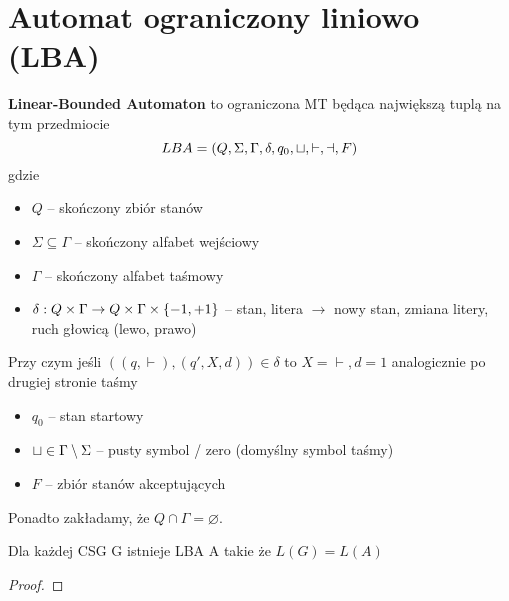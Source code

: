 \section{Automat ograniczony liniowo (LBA)}


\begin{definition}

 \textbf{Linear-Bounded Automaton} to ograniczona MT będąca największą tuplą na tym przedmiocie 
    \[
        LBA = (Q, \Sigma, \Gamma, \delta, q_0, \sqcup, \vdash, \dashv, F)
    \]
    gdzie
    \begin{itemize}
        \item \( Q \) -- skończony zbiór stanów
        \item \( \Sigma \subseteq \Gamma \) -- skończony alfabet wejściowy
        \item \( \Gamma \) -- skończony alfabet taśmowy
        \item \( \delta : Q \times \Gamma \rightarrow 
        Q \times \Gamma \times \set{-1, +1}
        \) -- stan, litera \( \rightarrow \) nowy stan, zmiana litery, ruch głowicą (lewo, prawo)
    \end{itemize}
    Przy czym jeśli \( ((q, \vdash), (q', X, d)) \in \delta \) to \( X = \vdash, d = 1 \) analogicznie po drugiej stronie taśmy
    
    \begin{itemize}
        \item \( q_0 \) -- stan startowy
        \item \( \sqcup \in \Gamma \setminus \Sigma \) -- pusty symbol / zero (domyślny symbol taśmy)
        \item \( F \) -- zbiór stanów akceptujących
    \end{itemize}
    
    Ponadto zakładamy, że \(Q \cap \Gamma = \varnothing\). 
\end{definition}

\begin{theorem}
    Dla każdej CSG G istnieje LBA A takie że \(L(G) = L(A) \)
\end{theorem}

\begin{proof}

\end{proof}